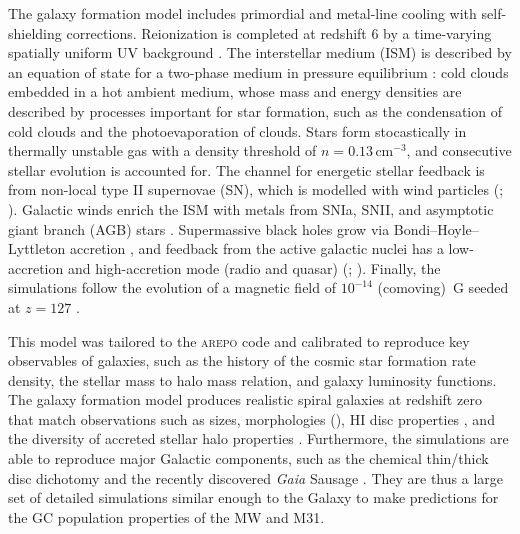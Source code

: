 \documentclass[a4paper,fleqn,usenatbib]{mnras}
\begin{document}
The galaxy formation model includes primordial and metal-line cooling with 
self-shielding corrections. Reionization is completed at redshift $6$ by a
time-varying spatially uniform UV background \citep{2009ApJ...703.1416F, 
2013MNRAS.436.3031V}. The interstellar medium (ISM) is described by an equation of 
state for a two-phase medium in pressure equilibrium \citep{2003MNRAS.339..289S}: 
cold clouds embedded in a hot ambient medium, whose mass and energy densities
are described by processes important for star formation, such as the condensation 
of cold clouds and the photoevaporation of clouds. Stars form stocastically in 
thermally unstable gas with a density threshold of $n = 0.13 \, \text{cm}^{-3}$,
and consecutive stellar evolution is accounted for. The channel for energetic
stellar feedback is from non-local type II supernovae (SN), which is modelled 
with wind particles (\citealt{2014MNRAS.437.1750M}; ).
Galactic winds enrich the ISM with metals from SNIa, SNII, and asymptotic giant 
branch (AGB) stars \citep{2013MNRAS.436.3031V}. Supermassive
black holes grow via Bondi–Hoyle–Lyttleton accretion \citep{1944MNRAS.104..273B,
1952MNRAS.112..195B}, and feedback from the active galactic nuclei has a low-accretion
and high-accretion mode (radio and quasar) (\citealt{2005MNRAS.361..776S, 
2014MNRAS.437.1750M}; ). Finally, the simulations 
follow the evolution of a magnetic field of $10^{-14}$ (comoving)~G seeded at 
$z = 127$ \citep{2013MNRAS.432..176P, 2014ApJ...783L..20P}.

This model was tailored to the \textsc{arepo} code and calibrated to reproduce
key observables of galaxies, such as the history of the cosmic star formation rate
density, the stellar mass to halo mass relation, and galaxy luminosity functions.
The galaxy formation model produces realistic spiral galaxies at redshift zero
that match observations such as sizes, morphologies (),
HI disc properties \citep{2017MNRAS.466.3859M}, and the diversity of accreted stellar
halo properties \citep{2019MNRAS.485.2589M}. Furthermore, the simulations are able to
reproduce major Galactic components, such as the chemical thin/thick disc dichotomy
\citep{2018MNRAS.474.3629G} and the recently discovered \textit{Gaia} Sausage 
\citep{2019MNRAS.484.4471F}. They are thus a large set of detailed simulations
similar enough to the Galaxy to make predictions for the GC population properties
of the MW and M31.
\end{document}
